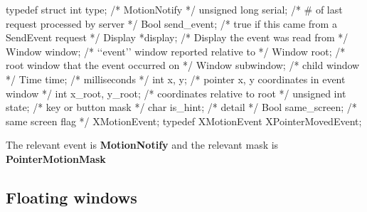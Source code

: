 \documentclass{report}
\begin{document}
\begin{itemize}
            \bigbreak \noindent 
            \begin{cppcode}
                typedef struct {
                    int type;               /* MotionNotify */
                    unsigned long serial;   /* # of last request processed by server */
                    Bool send_event;        /* true if this came from a SendEvent request */
                    Display *display;       /* Display the event was read from */
                    Window window;          /* ‘‘event’’ window reported relative to */
                    Window root;            /* root window that the event occurred on */
                    Window subwindow;       /* child window */
                    Time time;              /* milliseconds */
                    int x, y;               /* pointer x, y coordinates in event window */
                    int x_root, y_root;     /* coordinates relative to root */
                    unsigned int state;     /* key or button mask */
                    char is_hint;           /* detail */
                    Bool same_screen;       /* same screen flag */
                } XMotionEvent;
                typedef XMotionEvent XPointerMovedEvent;
            \end{cppcode}
            \bigbreak \noindent 
            The relevant event is \textbf{MotionNotify} and the relevant mask is \textbf{PointerMotionMask}






    \end{itemize}

    \pagebreak 
    \subsection{Floating windows}
\end{document}

